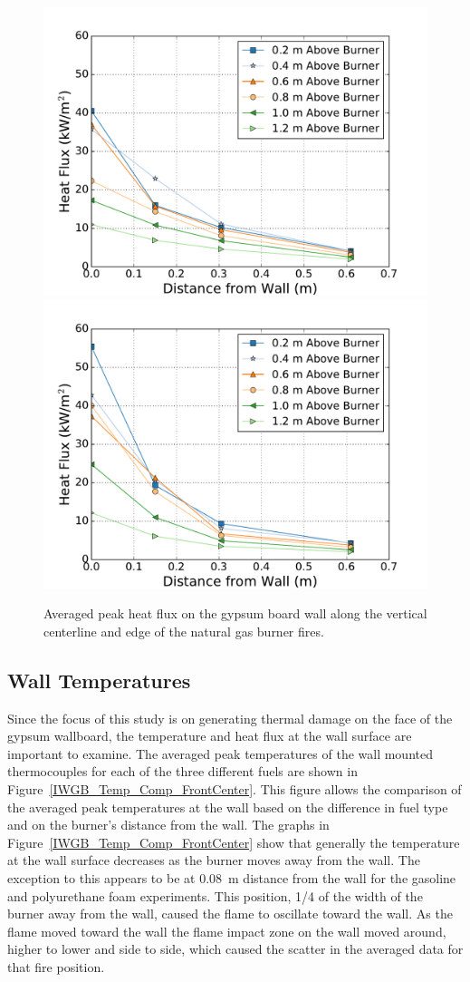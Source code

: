 \documentclass[twoside]{uocthesis}
\begin{document}
{\begin{figure}[ht!]
	\centering
	\includegraphics[width=.625\columnwidth]{../Figures/IWGB_NG_HF_Center_Avg}\\
	\includegraphics[width=.625\columnwidth]{../Figures/IWGB_NG_HF_Offset_Avg}\\
	\caption[Averaged peak heat flux on the gypsum board wall for the natural gas burner fires.]{Averaged peak heat flux on the gypsum board wall along the vertical centerline and edge of the natural gas burner fires.}
	\label{IWGB_NG_HF_CandEAvg}
\end{figure}

\clearpage

\subsection{Wall Temperatures}

Since the focus of this study is on generating thermal damage on the face of the gypsum wallboard, the temperature and heat flux at the wall surface are important to examine.  The averaged peak temperatures of the wall mounted thermocouples for each of the three different fuels are shown in Figure~\ref{IWGB_Temp_Comp_FrontCenter}. This figure allows the comparison of the averaged peak temperatures at the wall based on the difference in fuel type and on the burner's distance from the wall.  The graphs in Figure~\ref{IWGB_Temp_Comp_FrontCenter} show that generally the temperature at the wall surface decreases as the burner moves away from the wall.  The exception to this appears to be at 0.08~m distance from the wall for the gasoline and polyurethane foam experiments.  This position, 1/4 of the width of the burner away from the wall, caused the flame to oscillate toward the wall. As the flame moved toward the wall the flame impact zone on the wall moved around, higher to lower and side to side, which caused the scatter in the averaged data for that fire position.    

}
\end{document}
